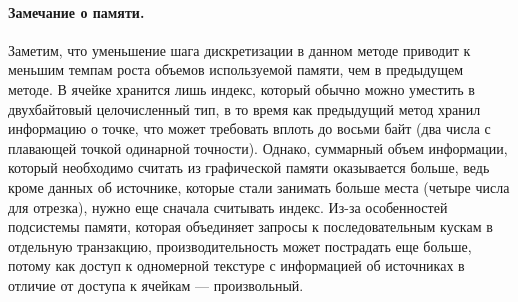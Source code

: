 \documentclass[12pt]{article}
\begin{document}
\paragraph{Замечание о памяти.} Заметим, что уменьшение шага дискретизации
в данном методе приводит к меньшим темпам роста объемов используемой памяти,
чем в предыдущем методе. В ячейке хранится 
лишь индекс, который обычно можно уместить в двухбайтовый целочисленный тип,
в то время как предыдущий метод хранил информацию о точке, что может
требовать вплоть до восьми байт (два числа с плавающей точкой одинарной точности).
Однако, суммарный объем информации, который необходимо считать из графической памяти 
оказывается больше, ведь кроме данных об источнике, которые
стали занимать больше места (четыре числа для отрезка), нужно еще 
сначала считывать индекс. Из-за особенностей подсистемы памяти,
которая объединяет запросы к последовательным кускам в отдельную 
транзакцию, производительность может пострадать еще больше, потому как 
доступ к одномерной текстуре с информацией об источниках в отличие от доступа
к ячейкам --- произвольный.
\end{document}
